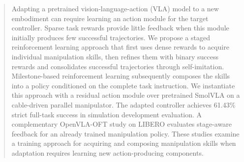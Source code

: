 \begin{abstract}
Adapting a pretrained vision-language-action (VLA) model to a new embodiment can require learning an action module for the target controller. Sparse task rewards provide little feedback when this module initially produces few successful trajectories. We propose a staged reinforcement learning approach that first uses dense rewards to acquire individual manipulation skills, then refines them with binary success rewards and consolidates successful trajectories through self-imitation. Milestone-based reinforcement learning subsequently composes the skills into a policy conditioned on the complete task instruction. We instantiate this approach with a residual action module over pretrained SmolVLA on a cable-driven parallel manipulator. The adapted controller achieves 61.43\% strict full-task success in simulation development evaluation. A complementary OpenVLA-OFT study on LIBERO evaluates stage-aware feedback for an already trained manipulation policy.  These studies examine a training approach for acquiring and composing manipulation skills when adaptation requires learning new action-producing components.
\end{abstract}

